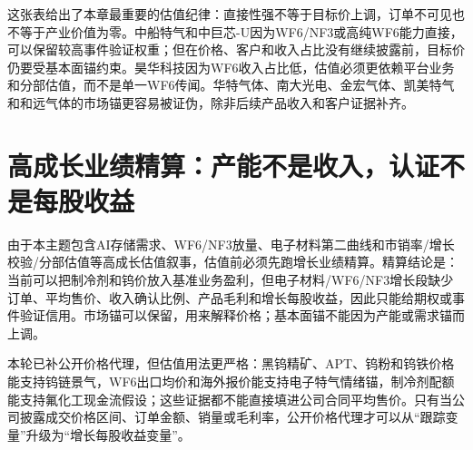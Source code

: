 这张表给出了本章最重要的估值纪律：直接性强不等于目标价上调，订单不可见也不等于产业价值为零。中船特气和中巨芯-U因为WF6/NF3或高纯WF6能力直接，可以保留较高事件验证权重；但在价格、客户和收入占比没有继续披露前，目标价仍要受基本面锚约束。昊华科技因为WF6收入占比低，估值必须更依赖平台业务和分部估值，而不是单一WF6传闻。华特气体、南大光电、金宏气体、凯美特气和和远气体的市场锚更容易被证伪，除非后续产品收入和客户证据补齐。

\section{高成长业绩精算：产能不是收入，认证不是每股收益}
由于本主题包含AI存储需求、WF6/NF3放量、电子材料第二曲线和市销率/增长校验/分部估值等高成长估值叙事，估值前必须先跑增长业绩精算。精算结论是：当前可以把制冷剂和钨价放入基准业务盈利，但电子材料/WF6/NF3增长段缺少订单、平均售价、收入确认比例、产品毛利和增长每股收益，因此只能给期权或事件验证信用。市场锚可以保留，用来解释价格；基本面锚不能因为产能或需求锚而上调。

本轮已补公开价格代理，但估值用法更严格：黑钨精矿、APT、钨粉和钨铁价格能支持钨链景气，WF6出口均价和海外报价能支持电子特气情绪锚，制冷剂配额能支持氟化工现金流假设；这些证据都不能直接填进公司合同平均售价。只有当公司披露成交价格区间、订单金额、销量或毛利率，公开价格代理才可以从“跟踪变量”升级为“增长每股收益变量”。

